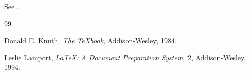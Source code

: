 See \cite{knuth1984,lamport1994}.

\begin{thebibliography}{99}

  Donald E. Knuth,
  \emph{The \TeX book},
  Addison-Wesley,
  1984.

  Leslie Lamport,
  \emph{\LaTeX: A Document Preparation System},
  2,
  Addison-Wesley,
  1994.

\end{thebibliography}
